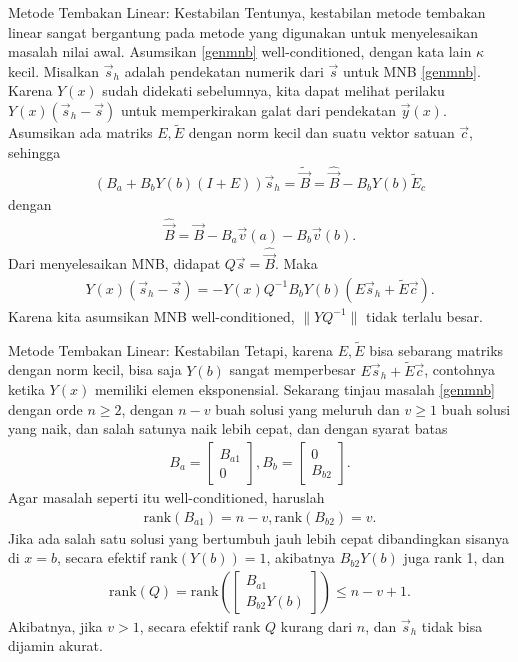 \documentclass[xcolor={dvipsnames}, 9pt]{beamer}
\begin{document}
	\begin{frame}{Metode Tembakan Linear: Kestabilan}
		Tentunya, kestabilan metode tembakan linear sangat bergantung pada metode yang digunakan untuk menyelesaikan masalah nilai awal. Asumsikan \eqref{genmnb} well-conditioned, dengan kata lain $\kappa$ kecil. \newline
		Misalkan $\vec{s}_h$ adalah pendekatan numerik dari $\vec{s}$ untuk MNB \eqref{genmnb}. Karena $Y(x)$ sudah didekati sebelumnya, kita dapat melihat perilaku $Y(x)(\vec{s}_h-\vec{s})$ untuk memperkirakan galat dari pendekatan $\vec{y}(x)$. Asumsikan ada matriks $E, \tilde{E}$ dengan norm kecil dan suatu vektor satuan $\vec{c}$, sehingga
		\begin{align*}
			(B_a+B_bY(b)(I+E))\vec{s}_h = \tilde{\vec{B}} = \hat{\vec{B}} - B_bY(b)\tilde{E}_c
		\end{align*}
		dengan
		\begin{gather*}
			\hat{\vec{B}} = \vec{B} - B_a\vec{v}(a) - B_b\vec{v}(b).
		\end{gather*}
		Dari menyelesaikan MNB, didapat $Q\vec{s} = \hat{\vec{B}}$. Maka
		\begin{align*}
			Y(x)(\vec{s}_h-\vec{s}) = -Y(x)Q^{-1}B_bY(b)(E\vec{s}_h+\tilde{E}\vec{c}).
		\end{align*}
		Karena kita asumsikan MNB well-conditioned, $\|YQ^{-1}\|$ tidak terlalu besar.
	\end{frame}
	\begin{frame}{Metode Tembakan Linear: Kestabilan}
		Tetapi, karena $E, \tilde{E}$ bisa sebarang matriks dengan norm kecil, bisa saja $Y(b)$ sangat memperbesar $E\vec{s}_h+\tilde{E}\vec{c}$, contohnya ketika $Y(x)$ memiliki elemen eksponensial. \newline
		Sekarang tinjau masalah \eqref{genmnb} dengan orde $n\geq 2$, dengan $n-v$ buah solusi yang meluruh dan $v\geq 1$ buah solusi yang naik, dan salah satunya naik lebih cepat, dan dengan syarat batas
		\begin{align*}
			B_a = \begin{bmatrix}
				B_{a1} \\ 0
			\end{bmatrix}, B_b = \begin{bmatrix}
				0 \\ B_{b2}
			\end{bmatrix}.
		\end{align*}
		Agar masalah seperti itu well-conditioned, haruslah
		\begin{align*}
			\text{rank}(B_{a1}) = n-v, \text{rank}(B_{b2}) = v.
		\end{align*}
		Jika ada salah satu solusi yang bertumbuh jauh lebih cepat dibandingkan sisanya di $x=b$, secara efektif $\text{rank}(Y(b)) = 1$, akibatnya $B_{b2}Y(b)$ juga rank 1, dan
		\begin{align*}
			\text{rank}(Q) = \text{rank}\left(\begin{bmatrix}
				B_{a1} \\ B_{b2}Y(b)
			\end{bmatrix}\right) \leq n-v+1.
		\end{align*}
		Akibatnya, jika $v>1$, secara efektif rank $Q$ kurang dari $n$, dan $\vec{s}_h$ tidak bisa dijamin akurat.
	\end{frame}
\end{document}
